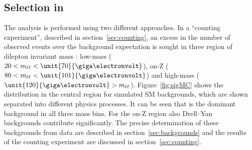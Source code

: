 \subsection{Selection in \mll}
The analysis is performed using two different approaches. In a ``counting experiment'', described in section~\ref{sec:counting}, an excess in the number of observed events over the background expectation is sought in three region of dilepton invariant mass \mll: low-mass ($\mathrm{20}< \mll < \unit{70}{\giga\electronvolt}$), on-Z ($\mathrm{80}< \mll < \unit{101}{\giga\electronvolt}$) and high-mass ($\unit{120}{\giga\electronvolt} > \mll$). Figure~\ref{fig:sigMC} shows the \mll distribution in the central region for simulated SM backgrounds, which are shown separated into different physics processes. It can be seen that \ttbar is the dominant background in all three mass bins. For the on-Z region also Drell--Yan backgrounds contribute significantly. The precise determination of these backgrounds from data are described in section~\ref{sec:backgrounds} and the results of the counting experiment are discussed in section~\ref{sec:counting}.

